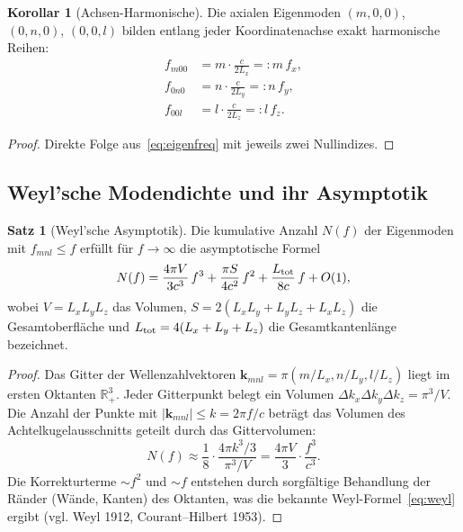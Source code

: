 ﻿\documentclass[12pt, a4paper]{article}
\theoremstyle{definition}
\newtheorem{satz}{Satz}[section]
\newtheorem{korollar}{Korollar}[section]
\theoremstyle{remark}
\newcommand{\R}{\mathbb{R}}
\newcommand{\Lx}{L_x}
\newcommand{\Ly}{L_y}
\newcommand{\Lz}{L_z}
\begin{document}
\begin{korollar}[Achsen-Harmonische]
\label{kor:achsen_harm}
Die axialen Eigenmoden $(m,0,0)$, $(0,n,0)$, $(0,0,l)$ bilden entlang
jeder Koordinatenachse exakt harmonische Reihen:
\begin{align*}
  f_{m00} &= m \cdot \frac{c}{2\Lx} =: m\,f_x,\\
  f_{0n0} &= n \cdot \frac{c}{2\Ly} =: n\,f_y,\\
  f_{00l} &= l \cdot \frac{c}{2\Lz} =: l\,f_z.
\end{align*}
\end{korollar}

\begin{proof}
Direkte Folge aus~\eqref{eq:eigenfreq} mit jeweils zwei Nullindizes. 
\end{proof}

\subsection{Weyl'sche Modendichte und ihr Asymptotik}

\begin{satz}[Weyl'sche Asymptotik]
\label{satz:weyl}
Die kumulative Anzahl $N(f)$ der Eigenmoden mit $f_{mnl} \leq f$ erfüllt
für $f \to \infty$ die asymptotische Formel
\begin{equation}
  N(f) = \frac{4\pi V}{3c^3}\,f^3 + \frac{\pi S}{4c^2}\,f^2 + \frac{L_{\rm tot}}{8c}\,f + O(1),
  \label{eq:weyl}
\end{equation}
wobei $V = \Lx\Ly\Lz$ das Volumen, $S = 2(\Lx\Ly + \Ly\Lz + \Lx\Lz)$
die Gesamtoberfläche und $L_{\rm tot} = 4(\Lx+\Ly+\Lz)$ die Gesamtkantenlänge bezeichnet.
\end{satz}

\begin{proof}
Das Gitter der Wellenzahlvektoren $\mathbf{k}_{mnl} = \pi(m/\Lx, n/\Ly, l/\Lz)$
liegt im ersten Oktanten $\R^3_+$. Jeder Gitterpunkt belegt ein Volumen
$\Delta k_x \Delta k_y \Delta k_z = \pi^3/V$.
Die Anzahl der Punkte mit $|\mathbf{k}_{mnl}| \leq k = 2\pi f/c$ beträgt
das Volumen des Achtelkugelausschnitts geteilt durch das Gittervolumen:
\[
  N(f) \approx \frac{1}{8} \cdot \frac{4\pi k^3/3}{\pi^3/V}
  = \frac{4\pi V}{3} \cdot \frac{f^3}{c^3}.
\]
Die Korrekturterme $\sim f^2$ und $\sim f$ entstehen durch sorgfältige
Behandlung der Ränder (Wände, Kanten) des Oktanten, was die bekannte
Weyl-Formel~\eqref{eq:weyl} ergibt (vgl. Weyl 1912, Courant--Hilbert 1953). 
\end{proof}
\end{document}
